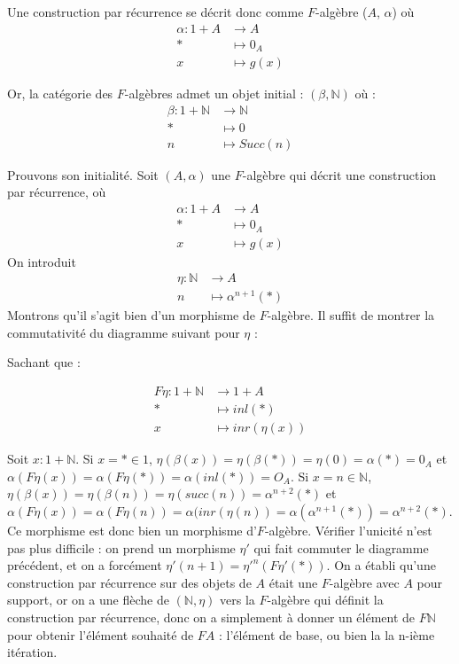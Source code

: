 \documentclass{article}
\newcommand{\N}{\mathbb{N}}
\begin{document}
     Une construction par récurrence se décrit donc comme $F$-algèbre ($A$, $\alpha$) où
\begin{align*}
    \alpha : 1 + A & \rightarrow A \\ 
    * & \mapsto 0_A \\ 
    x & \mapsto g(x)
\end{align*}

Or, la catégorie des $F$-algèbres admet un objet initial : $(\beta, \N)$ où : 
\begin{align*}
\beta : 1 + \N & \rightarrow \N \\
        * & \mapsto 0 \\ 
        n & \mapsto Succ(n)
\end{align*}

Prouvons son initialité. Soit $(A, \alpha)$ une $F$-algèbre qui décrit une construction par récurrence, où 
\begin{align*}
    \alpha : 1 + A & \rightarrow A \\ 
    * & \mapsto 0_A \\ 
    x & \mapsto g(x)
\end{align*}
On introduit
\begin{align*}
    \eta : \N & \rightarrow  A \\ 
    n & \mapsto \alpha^{n+1}(*)    
\end{align*} 
Montrons qu'il s'agit bien d'un morphisme de $F$-algèbre. Il suffit de montrer la commutativité du diagramme suivant pour $\eta$ : 
\begin{center}
\end{center}

Sachant que :

\begin{align*}
    F \eta : 1 + \N & \rightarrow 1 + A \\ 
        * & \mapsto inl(*) \\ 
        x & \mapsto inr(\eta(x))  
\end{align*}

Soit $x : 1 + \N$. Si $x = * \in 1$, $ \eta(\beta(x)) = \eta(\beta(*)) = \eta(0) = \alpha(*) = 0_A $ et $ \alpha(F \eta (x)) = \alpha( F \eta (*)) = \alpha(inl(*)) = O_A $. Si $x = n \in \N$, $ \eta(\beta(x)) = \eta(\beta(n)) = \eta(succ(n)) = \alpha^{n+2}(*) $ et $ \alpha( F \eta (x)) = \alpha(F \eta (n)) = \alpha(inr(\eta(n)) = \alpha(\alpha^{n+1}(*)) = \alpha^{n+2}(*) $. Ce morphisme est donc bien un morphisme d'$F$-algèbre. Vérifier l'unicité n'est pas plus difficile : on prend un morphisme $\eta'$ qui fait commuter le diagramme précédent, et on a forcément $\eta'(n+1) = \eta'^n(F\eta'(*)) $. On a établi qu'une construction par récurrence sur des objets de $A$ était une $F$-algèbre avec $A$ pour support, or on a une flèche de $(\N, \eta)$ vers la $F$-algèbre qui définit la construction par récurrence, donc on a simplement à donner un élément de $F\N$ pour obtenir l'élément souhaité de $FA$ : l'élément de base, ou bien la la n-ième itération. 
\end{document}
